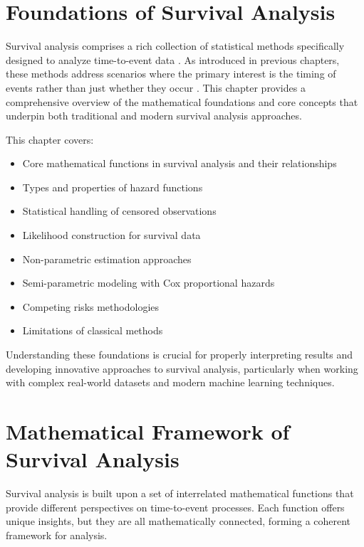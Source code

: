 \section{Foundations of Survival Analysis}

Survival analysis comprises a rich collection of statistical methods specifically designed to analyze time-to-event data \parencite{kleinbaum2012}. As introduced in previous chapters, these methods address scenarios where the primary interest is the timing of events rather than just whether they occur \parencite{cox1972}. This chapter provides a comprehensive overview of the mathematical foundations and core concepts that underpin both traditional and modern survival analysis approaches.

\begin{notebox}[title=Chapter Overview]
This chapter covers:
\begin{itemize}
    \item Core mathematical functions in survival analysis and their relationships
    \item Types and properties of hazard functions
    \item Statistical handling of censored observations
    \item Likelihood construction for survival data
    \item Non-parametric estimation approaches
    \item Semi-parametric modeling with Cox proportional hazards
    \item Competing risks methodologies
    \item Limitations of classical methods
\end{itemize}
\end{notebox}

Understanding these foundations is crucial for properly interpreting results and developing innovative approaches to survival analysis, particularly when working with complex real-world datasets and modern machine learning techniques.

\section{Mathematical Framework of Survival Analysis}

Survival analysis is built upon a set of interrelated mathematical functions that provide different perspectives on time-to-event processes. Each function offers unique insights, but they are all mathematically connected, forming a coherent framework for analysis.

